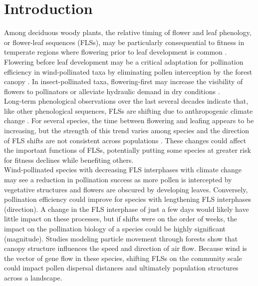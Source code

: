 \documentclass[11pt]{article}\usepackage[]{graphicx}\usepackage[]{color}
\begin{document}
\section*{Introduction}
\noindent Among deciduous woody plants, the relative timing of flower and leaf phenology, or flower-leaf sequences (FLSs), may be particularly consequential to fitness in temperate regions where flowering prior to leaf development is common \citep{Rathcke_1985,Gougherty2018}. Flowering before leaf development may be a critical adaptation for pollination efficiency in wind-pollinated taxa by eliminating pollen interception by the forest canopy \citep{Whitehead1969}. In insect-pollinated taxa, flowering-first may increase the visibility of flowers to pollinators \citep{Janzen1967,Savage2019} or alleviate hydraulic demand in dry conditions \citep{Gougherty2018, Franklin2016}.\\

\noindent Long-term phenological observations over the last several decades indicate that, like other phenological sequences, FLSs are shifting due to anthropogenic climate change \citep{Buonaiuto2020}. For several species, the time between flowering and leafing appears to be increasing, but the strength of this trend varies among species and the direction of FLS shifts are not consistent across populations \citep{Buonaiuto2020}. These changes could affect the important functions of FLSs, potentially putting some species at greater risk for fitness declines while benefiting others.\\

\noindent Wind-pollinated species with decreasing FLS interphases with climate change may see a reduction in pollination success as more pollen is intercepted by vegetative structures and flowers are obscured by developing leaves. Conversely, pollination efficiency could improve for species with lengthening FLS interphases (direction). A change in the FLS interphase of just a few days would likely have little impact on these processes, but if shifts were on the order of weeks, the impact on the pollination biology of a species could be highly significant (magnitude). Studies modeling particle movement through forests show that canopy structure influences the speed and direction of air flow\citep{Niklas1985, Jackson:1999aa}. Because wind is the vector of gene flow in these species, shifting FLSs on the community scale could impact pollen dispersal distances and ultimately population structures across a landscape.\\
\end{document}
